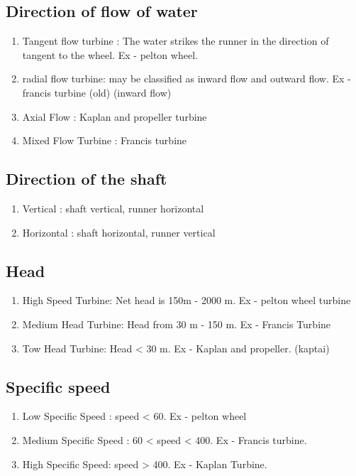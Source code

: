 \documentclass{article}
\begin{document}
\subsection*{Direction of flow of water}
\begin{enumerate}
  \item Tangent flow turbine : The water strikes the runner in the direction of tangent to the wheel. Ex - pelton wheel. 
  \item radial flow turbine: may be classified as inward flow and outward flow. Ex - francis turbine (old) (inward flow)
  \item Axial Flow : Kaplan and propeller turbine 
  \item Mixed Flow Turbine : Francis turbine 
\end{enumerate}

\subsection*{Direction of the shaft}
\begin{enumerate}
  \item Vertical : shaft vertical, runner horizontal 
  \item Horizontal : shaft horizontal, runner vertical 
\end{enumerate}

\subsection*{Head}
\begin{enumerate}
  \item High Speed Turbine: Net head is 150m - 2000 m. Ex - pelton wheel turbine 
  \item Medium Head Turbine: Head from 30 m - 150 m. Ex - Francis Turbine 
  \item Tow Head Turbine: Head < 30 m. Ex - Kaplan and propeller. (kaptai)  
\end{enumerate}

\subsection*{Specific speed}
\begin{enumerate}
  \item Low Specific Speed : speed < 60. Ex - pelton wheel 
  \item Medium Specific Speed : 60 < speed < 400.  Ex - Francis turbine. 
  \item High Specific Speed: speed > 400. Ex - Kaplan Turbine. 
\end{enumerate}
\end{document}
